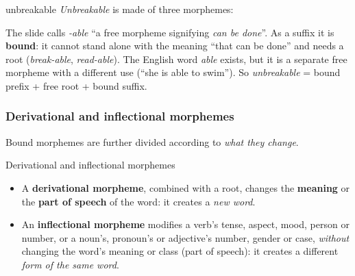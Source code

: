 \begin{nbexample}{unbreakable}
\emph{Unbreakable} is made of three morphemes:
\begin{center}
\end{center}
\end{nbexample}

\begin{nbwarning}
The slide calls \emph{-able} ``a free morpheme signifying \emph{can be done}''. As a
suffix it is \textbf{bound}: it cannot stand alone with the meaning ``that can be
done'' and needs a root (\emph{break-able}, \emph{read-able}). The English word
\emph{able} exists, but it is a separate free morpheme with a different use (``she is
able to swim''). So \emph{unbreakable} = bound prefix + free root + bound suffix.
\end{nbwarning}

\subsubsection{Derivational and inflectional morphemes}

Bound morphemes are further divided according to \emph{what they change}.

\begin{nbdef}{Derivational and inflectional morphemes}
\begin{itemize}[nosep]
  \item A \textbf{derivational morpheme}, combined with a root, changes the
        \textbf{meaning} or the \textbf{part of speech} of the word: it creates a
        \emph{new word}.
  \item An \textbf{inflectional morpheme} modifies a verb's tense, aspect, mood, person or
        number, or a noun's, pronoun's or adjective's number, gender or case,
        \emph{without} changing the word's meaning or class (part of speech): it creates
        a different \emph{form of the same word}.
\end{itemize}
\end{nbdef}

